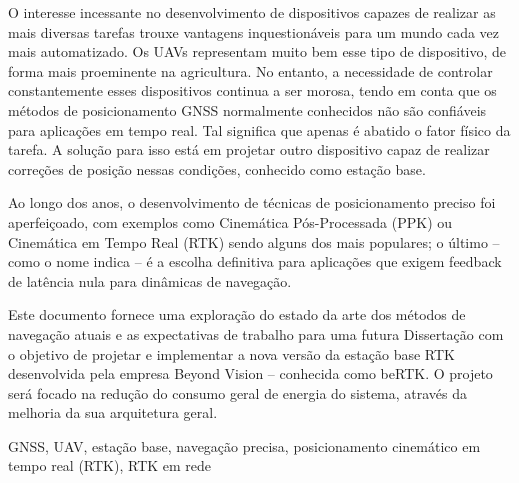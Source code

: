 O interesse incessante no desenvolvimento de dispositivos capazes de realizar as mais diversas tarefas trouxe vantagens inquestionáveis para um mundo cada vez mais automatizado. Os UAVs representam muito bem esse tipo de dispositivo, de forma mais proeminente na agricultura. No entanto, a necessidade de controlar constantemente esses dispositivos continua a ser morosa, tendo em conta que os métodos de posicionamento GNSS normalmente conhecidos não são confiáveis para aplicações em tempo real. Tal significa que apenas é abatido o fator físico da tarefa. A solução para isso está em projetar outro dispositivo capaz de realizar correções de posição nessas condições, conhecido como estação base.

Ao longo dos anos, o desenvolvimento de técnicas de posicionamento preciso foi aperfeiçoado, com exemplos como Cinemática Pós-Processada (PPK) ou Cinemática em Tempo Real (RTK) sendo alguns dos mais populares; o último -- como o nome indica -- é a escolha definitiva para aplicações que exigem feedback de latência nula para dinâmicas de navegação.

Este documento fornece uma exploração do estado da arte dos métodos de navegação atuais e as expectativas de trabalho para uma futura Dissertação com o objetivo de projetar e implementar a nova versão da estação base RTK desenvolvida pela empresa Beyond Vision -- conhecida como beRTK\textsuperscript{\textregistered}. O projeto será focado na redução do consumo geral de energia do sistema, através da melhoria da sua arquitetura geral.

\begin{keywords}
    GNSS, UAV, estação base, navegação precisa, posicionamento cinemático em tempo real (RTK), RTK em rede
\end{keywords}
